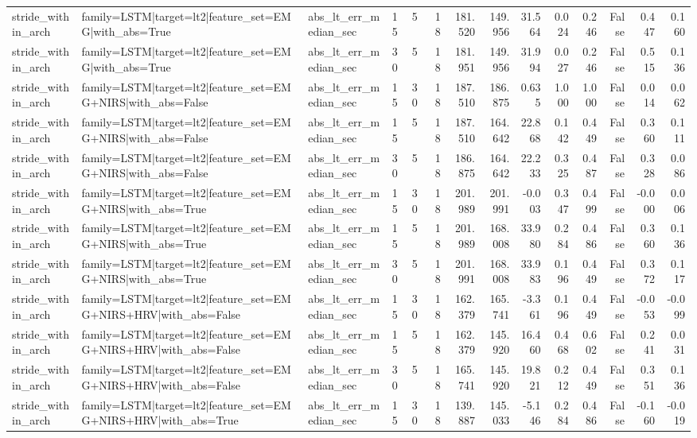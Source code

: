 \begin{table}
\begin{tabular}{lllllrrrrrrrrr}
stride_within_arch & family=LSTM|target=lt2|feature_set=EMG|with_abs=True & abs_lt_err_median_sec & 15 & 5 & 18 & 181.520 & 149.956 & 31.564 & 0.024 & 0.246 & False & 0.447 & 0.160 \\
stride_within_arch & family=LSTM|target=lt2|feature_set=EMG|with_abs=True & abs_lt_err_median_sec & 30 & 5 & 18 & 181.951 & 149.956 & 31.994 & 0.027 & 0.246 & False & 0.515 & 0.136 \\
stride_within_arch & family=LSTM|target=lt2|feature_set=EMG+NIRS|with_abs=False & abs_lt_err_median_sec & 15 & 30 & 18 & 187.510 & 186.875 & 0.635 & 1.000 & 1.000 & False & 0.014 & 0.062 \\
stride_within_arch & family=LSTM|target=lt2|feature_set=EMG+NIRS|with_abs=False & abs_lt_err_median_sec & 15 & 5 & 18 & 187.510 & 164.642 & 22.868 & 0.142 & 0.449 & False & 0.360 & 0.111 \\
stride_within_arch & family=LSTM|target=lt2|feature_set=EMG+NIRS|with_abs=False & abs_lt_err_median_sec & 30 & 5 & 18 & 186.875 & 164.642 & 22.233 & 0.325 & 0.487 & False & 0.328 & 0.086 \\
stride_within_arch & family=LSTM|target=lt2|feature_set=EMG+NIRS|with_abs=True & abs_lt_err_median_sec & 15 & 30 & 18 & 201.989 & 201.991 & -0.003 & 0.347 & 0.499 & False & -0.000 & 0.006 \\
stride_within_arch & family=LSTM|target=lt2|feature_set=EMG+NIRS|with_abs=True & abs_lt_err_median_sec & 15 & 5 & 18 & 201.989 & 168.008 & 33.980 & 0.284 & 0.486 & False & 0.360 & 0.136 \\
stride_within_arch & family=LSTM|target=lt2|feature_set=EMG+NIRS|with_abs=True & abs_lt_err_median_sec & 30 & 5 & 18 & 201.991 & 168.008 & 33.983 & 0.196 & 0.449 & False & 0.372 & 0.117 \\
stride_within_arch & family=LSTM|target=lt2|feature_set=EMG+NIRS+HRV|with_abs=False & abs_lt_err_median_sec & 15 & 30 & 18 & 162.379 & 165.741 & -3.361 & 0.196 & 0.449 & False & -0.053 & -0.099 \\
stride_within_arch & family=LSTM|target=lt2|feature_set=EMG+NIRS+HRV|with_abs=False & abs_lt_err_median_sec & 15 & 5 & 18 & 162.379 & 145.920 & 16.460 & 0.468 & 0.602 & False & 0.241 & 0.031 \\
stride_within_arch & family=LSTM|target=lt2|feature_set=EMG+NIRS+HRV|with_abs=False & abs_lt_err_median_sec & 30 & 5 & 18 & 165.741 & 145.920 & 19.821 & 0.212 & 0.449 & False & 0.351 & 0.136 \\
stride_within_arch & family=LSTM|target=lt2|feature_set=EMG+NIRS+HRV|with_abs=True & abs_lt_err_median_sec & 15 & 30 & 18 & 139.887 & 145.033 & -5.146 & 0.284 & 0.486 & False & -0.160 & -0.019 \\

\end{tabular}
\end{table}
